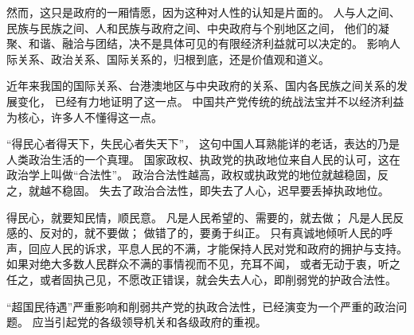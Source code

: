 \documentclass[UTF8, 11pt, oneside]{ctexart}
\begin{document}
然而，这只是政府的一厢情愿，因为这种对人性的认知是片面的。
人与人之间、民族与民族之间、人和民族与政府之间、中央政府与个别地区之间，
他们的凝聚、和谐、融洽与团结，决不是具体可见的有限经济利益就可以决定的。
影响人际关系、政治关系、国际关系的，归根到底，还是价值观和道义。

近年来我国的国际关系、台港澳地区与中央政府的关系、国内各民族之间关系的发展变化，
已经有力地证明了这一点。
中国共产党传统的统战法宝并不以经济利益为核心，许多人不懂得这一点。

“得民心者得天下，失民心者失天下”，
这句中国人耳熟能详的老话，表达的乃是人类政治生活的一个真理。
国家政权、执政党的执政地位来自人民的认可，这在政治学上叫做“合法性”。
政治合法性越高，政权或执政党的地位就越稳固，反之，就越不稳固。
失去了政治合法性，即失去了人心，迟早要丢掉执政地位。

得民心，就要知民情，顺民意。
凡是人民希望的、需要的，就去做；
凡是人民反感的、反对的，就不要做；
做错了的，要勇于纠正。
只有真诚地倾听人民的呼声，回应人民的诉求，平息人民的不满，才能保持人民对党和政府的拥护与支持。
如果对绝大多数人民群众不满的事情视而不见，充耳不闻，
或者无动于衷，听之任之，或者固执己见，不愿改正错误，就会失去人心，即削弱党的护政合法性。

“超国民待遇”严重影响和削弱共产党的执政合法性，已经演变为一个严重的政治问题。
应当引起党的各级领导机关和各级政府的重视。
\end{document}
